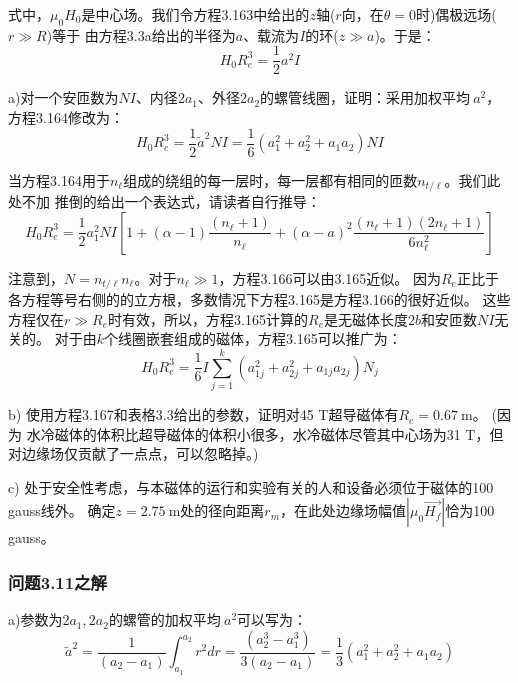式中，$\mu_0 H_0$是中心场。我们令方程3.163中给出的$z$轴($r$向，在$\theta=0$时)偶极远场($r\gg R$)等于
由方程3.3a给出的半径为$a$、载流为$I$的环($z\gg a$)。于是：
\begin{equation}
H_{0}R_{e}^{3}=\frac{1}{2}a^{2}I
\end{equation}

a)对一个安匝数为$NI$、内径$2a_1$、外径$2a_2$的螺管线圈，证明：采用加权平均$~{a}^2$，方程3.164修改为：
\begin{equation}
H_{0}R_{e}^{3}=\frac{1}{2}\tilde{a}^{2}NI=\frac{1}{6}(a_{1}^{2}+a_{2}^{2}+a_{1}a_{2})NI
\end{equation}

当方程3.164用于$n_{\ell}$组成的绕组的每一层时，每一层都有相同的匝数$n_{t/\ell}$。我们此处不加
推倒的给出一个表达式，请读者自行推导：
\begin{equation}
H_{0}R_{e}^{3}=\frac{1}{2}a_{1}^{2}NI[1+(\alpha-1)\frac{(n_{\ell}+1)}{n_{\ell}}+(\alpha-a)^{2}\frac{(n_{\ell}+1)(2n_{\ell}+1)}{6n_{\ell}^{2}}]
\end{equation}

注意到，$N=n_{t/\ell} n_{\ell}$。对于$n_{\ell}\gg1$，方程3.166可以由3.165近似。
因为$R_e$正比于各方程等号右侧的的立方根，多数情况下方程3.165是方程3.166的很好近似。
这些方程仅在$r\gg R_e$时有效，所以，方程3.165计算的$R_e$是无磁体长度$2b$和安匝数$NI$无关的。
对于由$k$个线圈嵌套组成的磁体，方程3.165可以推广为：
\begin{equation}
H_{0}R_{e}^{3}=\frac{1}{6}I\sum_{j=1}^{k}(a_{1j}^{2}+a_{2j}^{2}+a_{1j}a_{2j})N_{j}
\end{equation}

b) 使用方程3.167和表格3.3给出的参数，证明对45 T超导磁体有$R_e=0.67 \ \mathrm{m} $。 (因为
水冷磁体的体积比超导磁体的体积小很多，水冷磁体尽管其中心场为31 T，但对边缘场仅贡献了一点点，可以忽略掉。)

c) 处于安全性考虑，与本磁体的运行和实验有关的人和设备必须位于磁体的100 gauss线外。
确定$z=2.75\ \mathrm{m}$处的径向距离$r_m$，在此处边缘场幅值$|\mu_0 \vec{H_f}|$恰为100 gauss。

\subsubsection{问题3.11之解}
a)参数为$2a_1,2a_2$的螺管的加权平均$~{a}^2$可以写为：
\begin{equation*}
\tilde{a}^{2}=\frac{1}{(a_{2}-a_{1})}\int_{a_{1}}^{a_{2}}r^{2}dr=\frac{(a_{2}^{3}-a_{1}^{3})}{3(a_{2}-a_{1})}=\frac{1}{3}(a_{1}^{2}+a_{2}^{2}+a_{1}a_{2})\tag{S11.1}%
\end{equation*}

